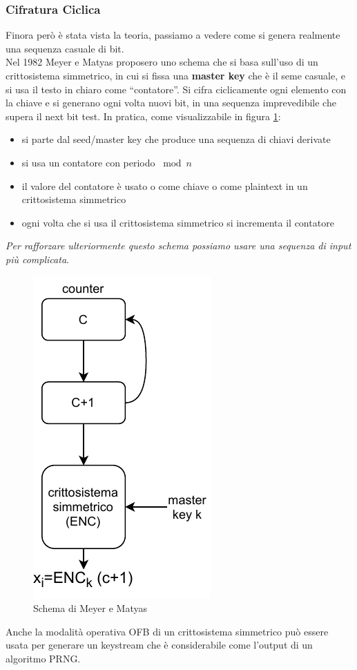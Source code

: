 \documentclass[a4paper,12pt, oneside]{book}
\begin{document}
\subsubsection{Cifratura Ciclica}
Finora però è stata vista la teoria, passiamo a vedere come si genera realmente
una sequenza casuale di bit.\\
Nel 1982 Meyer e Matyas proposero uno schema che si basa sull'uso di un
crittosistema simmetrico, in cui si fissa una \textbf{master key} che è il seme
casuale, e si usa il testo in chiaro come ``contatore''. Si cifra ciclicamente
ogni elemento con la chiave e si generano ogni volta nuovi bit, in una sequenza
imprevedibile che supera il next bit test. In pratica, come visualizzabile in
figura \ref{fig:prng}:
\begin{itemize}
  \item si parte dal seed/master key che produce una sequenza di chiavi derivate
  \item si usa un contatore con periodo $\bmod n$
  \item il valore del contatore è usato o come chiave o come plaintext in un
  crittosistema simmetrico 
  \item ogni volta che si usa il crittosistema simmetrico si incrementa il
  contatore
\end{itemize}
\textit{Per rafforzare ulteriormente questo schema possiamo usare una sequenza
  di input più complicata}. 
\begin{figure}
  \centering
  \includegraphics[scale = 0.8]{img/prng.pdf}
  \caption{Schema di Meyer e Matyas}
  \label{fig:prng}
\end{figure}
Anche la modalità operativa OFB di un crittosistema simmetrico può essere usata
per generare un keystream che è considerabile come l'output di un algoritmo
PRNG.\\
\end{document}
